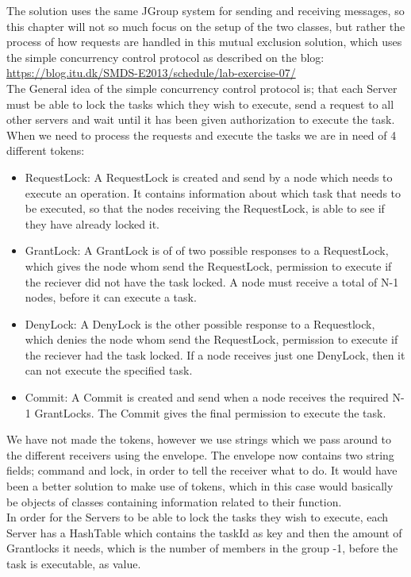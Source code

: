 The solution uses the same JGroup system for sending and receiving messages, so this chapter will not so much focus on the setup of the two classes, but rather the process of how requests are handled in this mutual exclusion solution, which uses the simple concurrency control protocol as described on the blog: \url{https://blog.itu.dk/SMDS-E2013/schedule/lab-exercise-07/} \\

The General idea of the simple concurrency control protocol is; that each Server must be able to lock the tasks which they wish to execute, send a request to all other servers and wait until it has been given authorization to execute the task. \\

When we need to process the requests and execute the tasks we are in need of 4 different tokens:
\begin{itemize}
\item RequestLock: A RequestLock is created and send by a node which needs to execute an operation. It contains information about which task that needs to be executed, so that the nodes receiving the RequestLock, is able to see if they have already locked it.
\item GrantLock: A GrantLock is of of two possible responses to a RequestLock, which gives the node whom send the RequestLock, permission to execute if the reciever did not have the task locked. A node must receive a total of N-1 nodes, before it can execute a task.
\item DenyLock: A DenyLock is the other possible response to a Requestlock, which denies the node whom send the RequestLock, permission to execute if the reciever had the task locked. If a node receives just one DenyLock, then it can not execute the specified task.
\item Commit: A Commit is created and send when a node receives the required N-1 GrantLocks. The Commit gives the final permission to execute the task.        
\end{itemize} We have not made the tokens, however we use strings which we pass around to the different receivers using the envelope. The envelope now contains two string fields; command and lock, in order to tell the receiver what to do. It would have been a better solution to make use of tokens, which in this case would basically be objects of classes containing information related to their function.\\

In order for the Servers to be able to lock the tasks they wish to execute, each Server has a HashTable which contains the taskId as key and then the amount of Grantlocks it needs, which is the number of members in the group -1, before the task is executable, as value. \\

